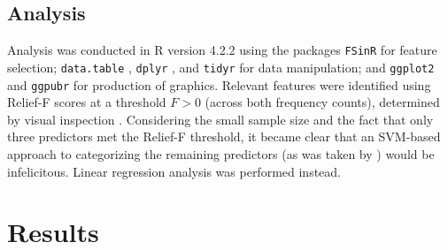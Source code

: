 \documentclass{article}
\begin{document}
\subsection{Analysis}
Analysis was conducted in R version 4.2.2 \parencite{r} using the packages \texttt{FSinR} \parencite{fsinr} for feature selection; \texttt{data.table} \parencite{datatable}, \texttt{dplyr} \parencite{dplyr}, and \texttt{tidyr} \parencite{tidyr} for data manipulation; and \texttt{ggplot2} \parencite{ggplot2} and \texttt{ggpubr} \parencite{ggpubr} for production of graphics. Relevant features were identified using Relief-F scores at a threshold $F > 0$ (across both frequency counts), determined by visual inspection \parencite{kira1992}. Considering the small sample size and the fact that only three predictors met the Relief-F threshold, it became clear that an SVM-based approach to categorizing the remaining predictors (as was taken by \cite{abut2016}) would be infelicitous. Linear regression analysis was performed instead.

\section{Results}
\end{document}
